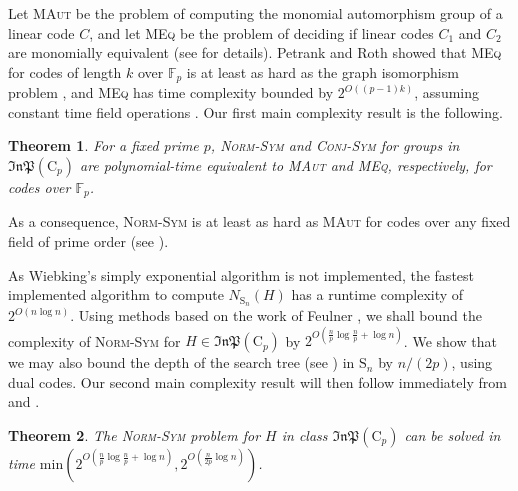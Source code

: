 \documentclass[11pt,a4paper]{article}
\newtheorem{theorem}{Theorem}[section]
\theoremstyle{definition}
\theoremstyle{remark}
\newcommand{\InP}{\mathfrak{InP}}
\newcommand{\Sy}{\mathrm{S}}
\newcommand{\Cy}{\mathrm{C}}
\begin{document}
Let \textsc{MAut} be the problem of computing the monomial automorphism group of a linear code $C$, and let \textsc{MEq} be the problem of deciding if linear codes $C_1$ and $C_2$ are monomially equivalent (see  for details).  
Petrank and Roth showed that \textsc{MEq} for codes of length $k$ over $\mathds{F}_p$ is at least as hard as the graph isomorphism problem \cite{codeEquivGI}, and \textsc{MEq} has time complexity bounded by $2^{O((p-1)k)}$, assuming constant time field operations \cite{sendrierHardnessCodeEquiv, BabaicodeEquivandGI}. 
Our first main complexity result is the following. 

\begin{theorem} \label{complexity main theorem}\label{norm of our groups polytime equiv to code aut}
For a fixed prime $p$, \textsc{Norm-Sym} and \textsc{Conj-Sym} for groups in $\InP(\Cy_p)$ are polynomial-time equivalent to \textsc{MAut} and \textsc{MEq}, respectively, for codes over $\mathds{F}_p$. 
\end{theorem}

As a consequence, \textsc{Norm-Sym} is at least as hard as \textsc{MAut} for codes over any fixed field of prime order (see ).

As Wiebking's simply exponential algorithm \cite{wiebking} is not implemented, 
the fastest implemented algorithm to compute $N_{\Sy_n}(H)$ has a runtime complexity of $2^{O(n\log{n})}$.
Using methods based on the work of Feulner \cite{feulner}, we shall bound the complexity of \textsc{Norm-Sym} for $H \in \mathfrak{InP}(\Cy_p)$ by $2^{O(\frac{n}{p}\log{\frac{n}{p}} + \log{n})}$.
We show that we may also bound the depth of the search tree (see ) in $\Sy_n$ by $n/(2p)$, using dual codes.   
Our second main complexity result will then follow immediately from  and .

\begin{theorem} \label{main theorem - cpk}
The \textsc{Norm-Sym} problem for $H$ in class $\mathfrak{InP}(\Cy_p)$ can be solved in time \linebreak $\mathrm{min}\left( 2^{O(\frac{n}{p} \log{\frac{n}{p}}+ \log{n})},  2^{O(\frac{n}{2p} \log{n})} \right)$. 
\end{theorem}
\end{document}
